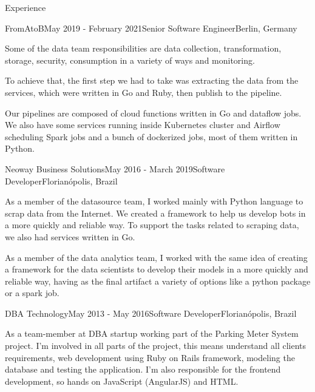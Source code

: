 \documentclass[
	a4paper, %
	10pt, %
]{resume} %
\begin{document}
\begin{rSection}{Experience}
	\begin{rSubsection}{FromAtoB}{May 2019 - February 2021}{Senior Software Engineer}{Berlin, Germany}
		\item Some of the data team responsibilities are data collection, transformation, storage, security, consumption in a variety of ways and monitoring.

To achieve that, the first step we had to take was extracting the data from the services, which were written in Go and Ruby, then publish to the pipeline.

Our pipelines are composed of cloud functions written in Go and dataflow jobs.
We also have some services running inside Kubernetes cluster and Airflow scheduling Spark jobs and a bunch of dockerized jobs, most of them written in Python.

	\end{rSubsection}

	\vspace{1mm}

	\begin{rSubsection}{Neoway Business Solutions}{May 2016 - March 2019}{Software Developer}{Florianópolis, Brazil}
		\item As a member of the datasource team, I worked mainly with Python language to scrap data from the Internet. We created a framework to help us develop bots in a more quickly and reliable way.
To support the tasks related to scraping data, we also had services written in Go.


As a member of the data analytics team, I worked with the same idea of creating a framework for the data scientists to develop their models in a more quickly and reliable way, having as the final artifact a variety of options like a python package or a spark job.


	\end{rSubsection}


	\begin{rSubsection}{DBA Technology}{May 2013 - May 2016}{Software Developer}{Florianópolis, Brazil}
		\item As a team-member at DBA startup working part of the Parking Meter System project. I'm involved in all parts of the project, this means understand all clients requirements, web development using Ruby on Rails framework, modeling the database and testing the application. I'm also responsible for the frontend development, so hands on JavaScript (AngularJS) and HTML.


\end{rSubsection}
\end{rSection}
\end{document}
